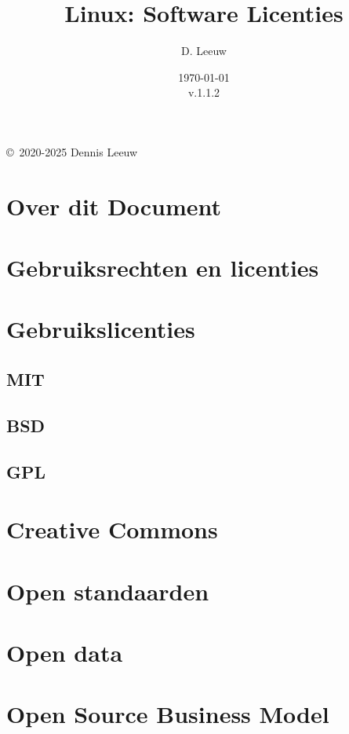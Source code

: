 \documentclass[a4paper,12pt,twoside,openright,titlepage]{book}
\author{D. Leeuw}
\title{Linux: Software Licenties}
\date{\today\\v.1.1.2}
\begin{document}

\maketitle

\copyright\ 2020-2025 Dennis Leeuw\\




\frontmatter
\chapter{Over dit Document}
%
%

\tableofcontents

\mainmatter

\chapter{Gebruiksrechten en licenties}

\chapter{Gebruikslicenties}
\section{MIT}

\section{BSD}

\section{GPL}

\chapter{Creative Commons}

\chapter{Open standaarden}

\chapter{Open data}

\chapter{Open Source Business Model}


\backmatter
\printindex
\end{document}
